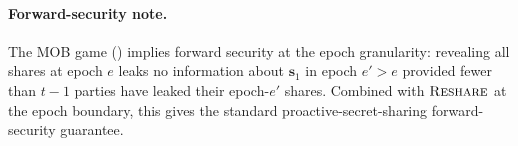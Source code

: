 \paragraph{Forward-security note.}
The MOB game () implies forward security at the epoch
granularity: revealing all shares at epoch $e$ leaks no information
about $\mathbf{s}_1$ in epoch $e' > e$ provided fewer than $t-1$
parties have leaked their epoch-$e'$ shares. Combined with $\textsc{Reshare}$
at the epoch boundary, this gives the standard
proactive-secret-sharing forward-security guarantee.
